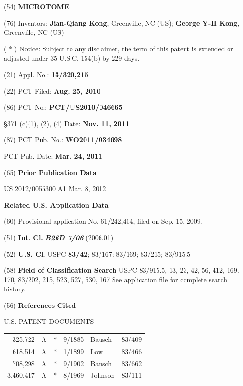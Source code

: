 \documentclass{article}
\begin{document}
\begin{hangpars}
(54) \textbf{MICROTOME}

(76) Inventors: \textbf{Jian-Qiang Kong}, Greenville, NC (US); \textbf{George Y-H Kong}, Greenville, NC (US)

( * ) Notice: Subject to any disclaimer, the term of this patent is extended or adjusted under 35 U.S.C. 154(b) by 229 days.

(21) Appl. No.: \textbf{13/320,215}

(22) PCT Filed: \textbf{Aug. 25, 2010}

(86) PCT No.: \textbf{PCT/US2010/046665}

\S 371 (c)(1), (2), (4) Date: \textbf{Nov. 11, 2011}

(87) PCT Pub. No.: \textbf{WO2011/034698}

PCT Pub. Date: \textbf{Mar. 24, 2011}

(65) \textbf{Prior Publication Data}

US 2012/0055300 A1 Mar. 8, 2012

\textbf{Related U.S. Application Data}

(60) Provisional application No. 61/242,404, filed on Sep. 15, 2009.

(51) \textbf{Int. Cl.} \textbf{\textit{B26D 7/06}} (2006.01)

(52) \textbf{U.S. Cl.} USPC \textbf{83/42}; 83/167; 83/169; 83/215; 83/915.5

(58) \textbf{Field of Classification Search} USPC 83/915.5, 13, 23, 42, 56, 412, 169, 170, 83/202, 215, 523, 527, 530, 167 See application file for complete search history.

(56) \textbf{References Cited}

\end{hangpars}
\begin{center}U.S. PATENT DOCUMENTS\end{center}
\noindent
\begin{tabular}{@{}rlcrll@{}}
325,722 & A & * & 9/1885 & Bausch & 83/409\\
618,514 & A & * & 1/1899 & Low & 83/466\\
708,298 & A & * & 9/1902 & Bausch & 83/662\\
3,460,417 & A & * & 8/1969 & Johnson & 83/111\\
\end{tabular}
\end{document}
